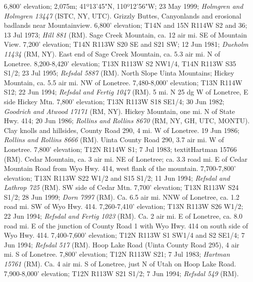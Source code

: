 6,800' elevation; 2,075m; 41º13'45"N, 110º12'56"W; 23 May 1999;
\textit{Holmgren and Holmgren 13447} (ISTC, NY, UTC).
Grizzly Buttes, Canyonlands and erosional badlands near Mountainview.
6,800' elevation;	T14N and 15N R114W S2 and 36; 13 Jul 1973;
\textit{Hill 881} (RM).
Sage Creek Mountain, ca. 12 air mi. SE of Mountain View. 7,200' elevation;
T14N R113W S20 SE and S21 SW; 12 Jun 1981; \textit{Dueholm 11434} (RM, NY).
East end of Sage Creek Mountain, ca. 5.3 air mi. N of Lonetree.
8,200-8,420' elevation; T13N R113W S2 NW1/4, T14N R113W S35 S1/2; 23 Jul 1995;
\textit{Refsdal 5887} (RM).
North Slope Uinta Mountains; Hickey Mountain, ca. 5.5 air mi. NW of Lonetree.
7,480-8,000' elevation; T13N R114W S12; 22 Jun 1994;
\textit{Refsdal and Fertig 1047} (RM).
5 mi. N 25 dg W of Lonetree, E side Hickey Mtn. 7,800' elevation;
T13N R113W S18 SE1/4; 30 Jun 1982; \textit{Goodrich and Atwood 17171} (RM, NY).
Hickey Mountain, one mi. N of State Hwy. 414; 20 Jun 1986;
\textit{Rollins and Rollins 8670} (RM, NY, GH, UTC, MONTU).
Clay knolls and hillsides, County Road 290, 4 mi. W of Lonetree. 19 Jun 1986;
\textit{Rollins and Rollins 8666} (RM).
Uinta County Road 290, 3.7 air mi. W of Lonetree. 7,800' elevation;
T12N R114W S1; 7 Jul 1983; textit{Hartman 15766} (RM).
Cedar Mountain, ca. 3 air mi. NE of Lonetree; ca. 3.3 road mi. E of Cedar
Mountain Road from Wyo Hwy. 414, west flank of the mountain.
7,700-7,800' elevation; T13N R113W S22 W1/2 and S15 S1/2; 11 Jun 1994;
\textit{Refsdal and Lathrop 725} (RM).
SW side of Cedar Mtn. 7,700' elevation; T13N R113W S24 S1/2; 28 Jun 1999;
\textit{Dorn 7997} (RM).
Ca. 6.5 air mi. NNW of Lonetree, ca. 1.2 road mi. SW of Wyo Hwy. 414.
7,260-7,410' elevation; T13N R113W S26 W1/2; 22 Jun 1994;
\textit{Refsdal and Fertig 1023} (RM).
Ca. 2 air mi. E of Lonetree, ca. 8.0 road mi. E of the junction of County Road 1
with Wyo Hwy. 414 on south side of Wyo Hwy. 414. 7,400-7,600' elevation;
T12N R113W S1 SW1/4 and S2 SE1/4; 7 Jun 1994; \textit{Refsdal 517} (RM).
Hoop Lake Road (Uinta County Road 295), 4 air mi. S of Lonetree.
7,800' elevation; T12N R113W S21; 7 Jul 1983; \textit{Hartman 15761} (RM).
Ca. 4 air mi. S of Lonetree, just N of Utah on Hoop Lake Road.
7,900-8,000' elevation; T12N R113W S21 S1/2; 7 Jun 1994;
\textit{Refsdal 549} (RM).

